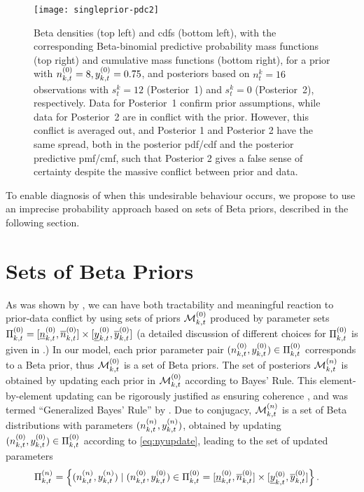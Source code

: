 \documentclass[12pt, a4paper]{elsarticle}
\begin{document}
\begin{figure}
\texttt{[image: singleprior-pdc2]}
\caption{Beta densities (top left) and cdfs (bottom left),
with the corresponding Beta-binomial predictive probability mass functions (top right) and cumulative mass functions (bottom right),
for a prior with $n^{(0)}_{k,t} = 8, y^{(0)}_{k,t} = 0.75$,
and posteriors based on $n^k_t=16$ observations with $s^k_t=12$ (Posterior~1) and $s^k_t=0$ (Posterior~2), respectively.
Data for Posterior~1 confirm prior assumptions,
while data for Posterior~2 are in conflict with the prior.
However, this conflict is averaged out,
and Posterior 1 and Posterior 2 have the same spread, both in the posterior pdf/cdf and the posterior predictive pmf/cmf,
such that Posterior 2 gives a false sense of certainty despite the massive conflict between prior and data.}
\label{fig:singleprior-pdc}
\end{figure}

To enable diagnosis of when this undesirable behaviour occurs,
we propose to use an imprecise probability approach
based on sets of Beta priors, described in the following section.


\section{Sets of Beta Priors}
\label{sec:setsofbetapriors}

As was shown by \citet{2009:WalterAugustin}, %
we can have both tractability and meaningful reaction to prior-data conflict
by using sets of priors $\mathcal{M}^{(0)}_{k,t}$ produced by parameter sets $\Pi^{(0)}_{k,t} = [\underline{n}^{(0)}_{k,t}, \overline{n}^{(0)}_{k,t}] \times [\underline{y}^{(0)}_{k,t}, \overline{y}^{(0)}_{k,t}]$
(a detailed discussion of different choices for $\Pi^{(0)}_{k,t}$ is given in \citet[\S 3.1]{2013:diss-gw}.)
In our model, each prior parameter pair $(n^{(0)}_{k,t}, y^{(0)}_{k,t}) \in \Pi^{(0)}_{k,t}$
corresponds to a Beta prior, thus $\mathcal{M}^{(0)}_{k,t}$ is a set of Beta priors.
The set of posteriors $\mathcal{M}^{(n)}_{k,t}$ is obtained by updating each prior in $\mathcal{M}^{(0)}_{k,t}$ according to Bayes' Rule.
This element-by-element updating can be rigorously justified
as ensuring coherence \citep[\S 2.5]{1991:walley}, and was termed ``Generalized Bayes' Rule'' by \citet[\S 6.4]{1991:walley}.
Due to conjugacy, $\mathcal{M}^{(n)}_{k,t}$ is a set of Beta distributions with parameters $(n^{(n)}_{k,t}, y^{(n)}_{k,t})$,
obtained by updating $(n^{(0)}_{k,t}, y^{(0)}_{k,t}) \in \Pi^{(0)}_{k,t}$ according to \eqref{eq:nyupdate},
leading to the set of updated parameters
\begin{align}
\Pi^{(n)}_{k,t} &= \Big\{ (n^{(n)}_{k,t}, y^{(n)}_{k,t}) \mid (n^{(0)}_{k,t}, y^{(0)}_{k,t}) \in \Pi^{(0)}_{k,t} = [\underline{n}^{(0)}_{k,t}, \overline{n}^{(0)}_{k,t}] \times [\underline{y}^{(0)}_{k,t}, \overline{y}^{(0)}_{k,t}] \Big\}\,.
\label{eq:paramsets}
\end{align}
\end{document}
